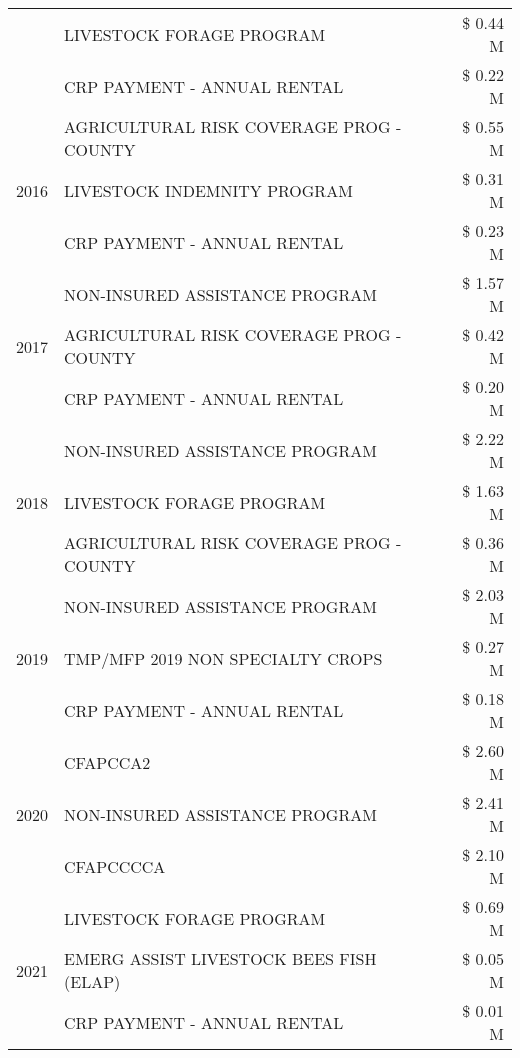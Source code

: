 \begin{tabular}{llr}
 & LIVESTOCK FORAGE PROGRAM & \$ 0.44 M \\
 & CRP PAYMENT - ANNUAL RENTAL & \$ 0.22 M \\
\cline{1-3}
\multirow[t]{3}{*}{2016} & AGRICULTURAL RISK COVERAGE PROG - COUNTY & \$ 0.55 M \\
 & LIVESTOCK INDEMNITY PROGRAM & \$ 0.31 M \\
 & CRP PAYMENT - ANNUAL RENTAL & \$ 0.23 M \\
\cline{1-3}
\multirow[t]{3}{*}{2017} & NON-INSURED ASSISTANCE PROGRAM & \$ 1.57 M \\
 & AGRICULTURAL RISK COVERAGE PROG - COUNTY & \$ 0.42 M \\
 & CRP PAYMENT - ANNUAL RENTAL & \$ 0.20 M \\
\cline{1-3}
\multirow[t]{3}{*}{2018} & NON-INSURED ASSISTANCE PROGRAM & \$ 2.22 M \\
 & LIVESTOCK FORAGE PROGRAM & \$ 1.63 M \\
 & AGRICULTURAL RISK COVERAGE PROG - COUNTY & \$ 0.36 M \\
\cline{1-3}
\multirow[t]{3}{*}{2019} & NON-INSURED ASSISTANCE PROGRAM & \$ 2.03 M \\
 & TMP/MFP 2019 NON SPECIALTY CROPS & \$ 0.27 M \\
 & CRP PAYMENT - ANNUAL RENTAL & \$ 0.18 M \\
\cline{1-3}
\multirow[t]{3}{*}{2020} & CFAPCCA2 & \$ 2.60 M \\
 & NON-INSURED ASSISTANCE PROGRAM & \$ 2.41 M \\
 & CFAPCCCCA & \$ 2.10 M \\
\cline{1-3}
\multirow[t]{3}{*}{2021} & LIVESTOCK FORAGE PROGRAM & \$ 0.69 M \\
 & EMERG ASSIST LIVESTOCK BEES FISH (ELAP) & \$ 0.05 M \\
 & CRP PAYMENT - ANNUAL RENTAL & \$ 0.01 M \\
\cline{1-3}
\bottomrule
\end{tabular}
